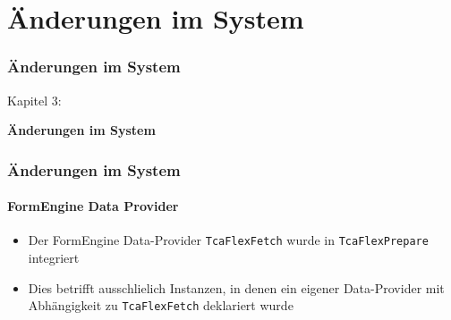 %

\section{Änderungen im System}
\begin{frame}[fragile]
	\frametitle{Änderungen im System}

	\begin{center}\huge{Kapitel 3:}\end{center}
	\begin{center}\huge{\color{typo3darkgrey}\textbf{Änderungen im System}}\end{center}

\end{frame}


\begin{frame}[fragile]
	\frametitle{Änderungen im System}
	\framesubtitle{FormEngine Data Provider}

	\begin{itemize}
		\item Der FormEngine Data-Provider \texttt{TcaFlexFetch} wurde in \texttt{TcaFlexPrepare} integriert
		\item Dies betrifft ausschlielich Instanzen, in denen ein eigener Data-Provider mit Abhängigkeit zu \texttt{TcaFlexFetch} deklariert wurde
	\end{itemize}

\end{frame}

